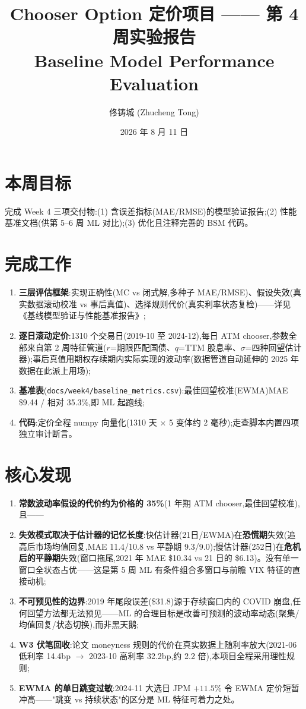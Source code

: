\documentclass[11pt]{ctexart}
\title{\textbf{Chooser Option 定价项目 —— 第 4 周实验报告}\\
\large Baseline Model Performance Evaluation}
\author{佟铸城 (Zhucheng Tong)}
\date{2026 年 8 月 11 日}
\begin{document}
\maketitle

\section{本周目标}
完成 Week 4 三项交付物:(1) 含误差指标(MAE/RMSE)的模型验证报告;(2) 性能基准文档(供第 5--6 周 ML 对比);(3) 优化且注释完善的 BSM 代码。

\section{完成工作}
\begin{enumerate}
  \item \textbf{三层评估框架}:实现正确性(MC vs 闭式解,多种子 MAE/RMSE)、假设失效(真实数据滚动校准 vs 事后真值)、选择规则代价(真实利率状态复检)——详见《基线模型验证与性能基准报告》;
  \item \textbf{逐日滚动定价}:1310 个交易日(2019-10 至 2024-12),每日 ATM chooser,参数全部来自第 2 周特征管道($r$=期限匹配国债、$q$=TTM 股息率、$\sigma$=四种回望估计器);事后真值用期权存续期内实际实现的波动率(数据管道自动延伸的 2025 年数据在此派上用场);
  \item \textbf{基准表}(\texttt{docs/week4/baseline\_metrics.csv}):最佳回望校准(EWMA)MAE \$9.44 / 相对 35.3\%,即 ML 起跑线;
  \item \textbf{代码}:定价全程 numpy 向量化(1310 天 $\times$ 5 变体约 2 毫秒);走查脚本内置四项独立审计断言。
\end{enumerate}

\section{核心发现}
\begin{enumerate}
  \item \textbf{常数波动率假设的代价约为价格的 35\%}(1 年期 ATM chooser,最佳回望校准),且——
  \item \textbf{失效模式取决于估计器的记忆长度}:快估计器(21日/EWMA)在\textbf{恐慌期}失效(追高后市场均值回复,MAE 11.4/10.8 vs 平静期 9.3/9.0);慢估计器(252日)在\textbf{危机后的平静期}失效(窗口拖尾,2021 年 MAE \$10.34 vs 21 日的 \$6.13)。没有单一窗口全状态占优——这是第 5 周 ML 有条件组合多窗口与前瞻 VIX 特征的直接动机;
  \item \textbf{不可预见性的边界}:2019 年尾段误差(\$31.8)源于存续窗口内的 COVID 崩盘,任何回望方法都无法预见——ML 的合理目标是改善可预测的波动率动态(聚集/均值回复/状态切换),而非黑天鹅;
  \item \textbf{W3 伏笔回收}:论文 moneyness 规则的代价在真实数据上随利率放大(2021-06 低利率 14.4bp $\to$ 2023-10 高利率 32.2bp,约 2.2 倍),本项目全程采用理性规则;
  \item \textbf{EWMA 的单日跳变过敏}:2024-11 大选日 JPM $+11.5\%$ 令 EWMA 定价短暂冲高——"跳变 vs 持续状态"的区分是 ML 特征可着力之处。
\end{enumerate}
\end{document}
